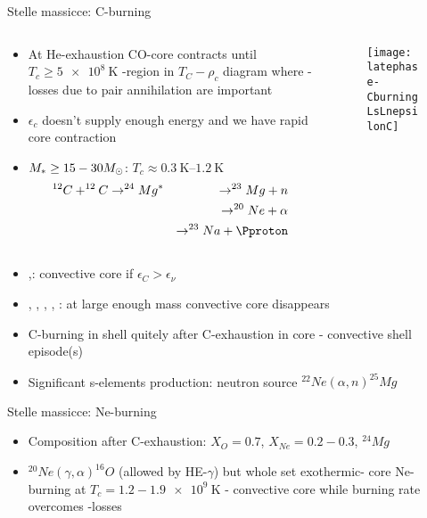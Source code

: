 \begin{frame}{Stelle massicce: C-burning}
\begin{columns}[T]
	\begin{column}{0.6\textwidth}
		\begin{itemize}
			\item At He-exhaustion CO-core contracts until $T_c\geq\SI{5e8}{\kelvin}$ -region in $T_C-\rho_c$ diagram where \Pnue-losses due to pair annihilation are important
			\item $\epsilon_c$ doesn't supply enough energy and we have rapid core contraction
			\item $M_*\geq15-30M_{\odot}$: $T_c\approx\SIrange{0.3}{1.2}{\kelvin}$
			\begin{alignat*}{2}
			&^{12}C+^{12}C\to^{24}Mg^*&\to^{23}Mg+n\\
			&&\to^{20}Ne+\alpha\\
			&&\to^{23}Na+\Pproton
			\end{alignat*}
		\end{itemize}
	\end{column}
	\begin{column}{0.4\textwidth}
		\begin{figure}[!ht]
			\texttt{[image: latephase-CburningLsLnepsilonC]}\label{fig:latephase-massive-taumburningmnext}
		\end{figure}
\end{column}\end{columns}
			\begin{itemize}
	\item {},: convective core if $\epsilon_C>\epsilon_{\nu}$
	\item {}, , , , \xaumenta{\epsilon_{\nu}}: at large enough mass convective core disappears
	\item C-burning in shell quitely after C-exhaustion in core - convective shell episode(s)
	\item Significant s-elements production: neutron source $^{22}Ne(\alpha,n)^{25}Mg$
\end{itemize}
\end{frame}

\begin{frame}{Stelle massicce: Ne-burning}
\begin{itemize}
\item Composition after C-exhaustion: $X_O=0.7$, $X_{Ne}=0.2-0.3$, $^{24}Mg$
\item $^{20}Ne(\gamma,\alpha)^{16}O$ (allowed by HE-$\gamma$) but whole set exothermic- core Ne-burning at $T_c=1.2-1.9\SI{e9}{\kelvin}$ - convective core while burning rate overcomes \Pnue-losses
\end{itemize}
\end{frame}

